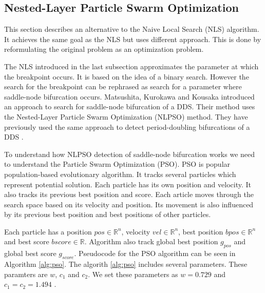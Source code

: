 \subsection{Nested-Layer Particle Swarm Optimization}
This section describes an alternative to the Naive Local Search (NLS) algorithm.
It achieves the same goal as the NLS but uses different approach.
This is done by reformulating the original problem as an optimization problem.
\par
The NLS introduced in the last subsection approximates the parameter at which the breakpoint occurs.
It is based on the idea of a binary search.
However the search for the breakpoint can be rephrased as search for a parameter where saddle-node bifurcation occurs.
Matsushita, Kurokawa and Kousaka \cite{Matsushita2019} introduced an approach to search for saddle-node bifurcation of a DDS.
Their method uses the Nested-Layer Particle Swarm Optimization (NLPSO) method.
They have previously used the same approach to detect period-doubling bifurcations of a DDS \cite{Matsushita20170721}.
\par
To understand how NLPSO detection of saddle-node bifurcation works we need to understand the Particle Swarm Optimization (PSO).
PSO is popular population-based evolutionary algorithm.
It tracks several particles which represent potential solution.
Each particle has its own position and velocity. It also tracks its previous best position and score.
Each article moves through the search space based on its velocity and position.
Its movement is also influenced by its previous best position and best positions of other particles. \cite{Matsushita2019}
\par
Each particle has a position $pos \in \mathbb{R}^{n}$, velocity $vel \in \mathbb{R}^{n}$, best position $bpos \in \mathbb{R}^{n}$ and best score $bscore \in \mathbb{R}$.
Algorithm also track global best position $g_{pos}$ and global best score $g_{score}$.
Pseudocode for the PSO algorithm can be seen in Algorithm \ref{alg:pso}.
The algorith \ref{alg:pso} includes several parameters.
These paramters are $w$, $c_{1}$ and $c_{2}$.
We set these parameters as $w=0.729$ and $c_{1}=c_{2}=1.494$ \cite{Matsushita2019}.

